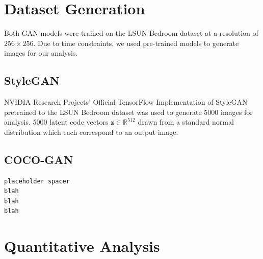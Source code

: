 \documentclass[12pt]{article}
\begin{document}
\begin{multicols*}{2}
        \section{Dataset Generation}
        \label{sec:dataset}
        Both GAN models were trained on the LSUN Bedroom dataset\cite{lsunBedroom} at a resolution of $256 \times 256$.
        Due to time constraints, we used pre-trained models to generate images for our analysis.

        \label{sec:datasetGeneration}
        \subsection{StyleGAN}
        \label{subsec:styleganGeneration}
        NVIDIA Research Projects' Official TensorFlow Implementation of StyleGAN pretrained to the LSUN Bedroom dataset\cite{styleGANCode} was used to generate 5000 images for analysis.
        5000 latent code vectors $\mathbf{z} \in \mathbb{R}^{512}$ drawn from a standard normal distribution which each correspond to an output image.


        \subsection{COCO-GAN}
        \label{subsec:cocoganGeneration}
        \begin{verbatim}placeholder spacer
blah
blah
blah \end{verbatim}
        \section{Quantitative Analysis}
        \label{sec:quantitative}

\end{multicols*}
\end{document}

